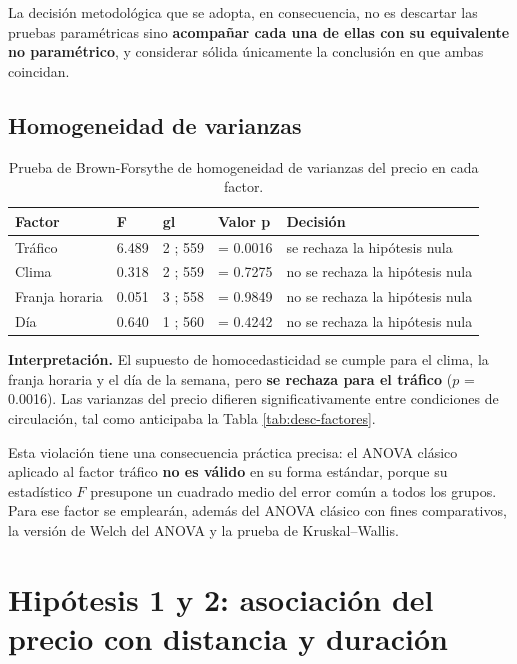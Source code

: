 \documentclass[
]{book}
\begin{document}
La decisión metodológica que se adopta, en consecuencia, no es descartar las pruebas
paramétricas sino \textbf{acompañar cada una de ellas con su equivalente no paramétrico}, y
considerar sólida únicamente la conclusión en que ambas coincidan.

\subsection{Homogeneidad de varianzas}\label{homogeneidad-de-varianzas}

\begin{table}

\caption{\label{tab:bf}Prueba de Brown-Forsythe de homogeneidad de varianzas del precio en cada factor.}
\centering
\begin{tabular}[t]{l|l|l|l|l}
\hline
Factor & F & gl & Valor p & Decisión\\
\hline
Tráfico & 6.489 & 2 ; 559 & = 0.0016 & se rechaza la hipótesis nula\\
\hline
Clima & 0.318 & 2 ; 559 & = 0.7275 & no se rechaza la hipótesis nula\\
\hline
Franja horaria & 0.051 & 3 ; 558 & = 0.9849 & no se rechaza la hipótesis nula\\
\hline
Día & 0.640 & 1 ; 560 & = 0.4242 & no se rechaza la hipótesis nula\\
\hline
\end{tabular}
\end{table}

\textbf{Interpretación.} El supuesto de homocedasticidad se cumple para el clima, la franja horaria
y el día de la semana, pero \textbf{se rechaza para el tráfico} (\(p\) = 0.0016). Las
varianzas del precio difieren significativamente entre condiciones de circulación, tal como
anticipaba la Tabla \ref{tab:desc-factores}.

Esta violación tiene una consecuencia práctica precisa: el ANOVA clásico aplicado al factor
tráfico \textbf{no es válido} en su forma estándar, porque su estadístico \(F\) presupone un
cuadrado medio del error común a todos los grupos. Para ese factor se emplearán, además del
ANOVA clásico con fines comparativos, la versión de Welch del ANOVA y la prueba de
Kruskal--Wallis.

\section{Hipótesis 1 y 2: asociación del precio con distancia y duración}\label{hipuxf3tesis-1-y-2-asociaciuxf3n-del-precio-con-distancia-y-duraciuxf3n}
\end{document}
